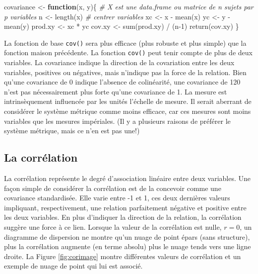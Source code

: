 \documentclass[
]{book}
\newenvironment{Shaded}{}{}
\newcommand{\CommentTok}[1]{\textit{#1}}
\newcommand{\ControlFlowTok}[1]{\textbf{#1}}
\newcommand{\DecValTok}[1]{#1}
\newcommand{\FunctionTok}[1]{#1}
\newcommand{\NormalTok}[1]{#1}
\newcommand{\OtherTok}[1]{#1}
\newcommand{\SpecialCharTok}[1]{#1}
\begin{document}
\begin{Shaded}
\begin{Highlighting}[]
\NormalTok{covariance }\OtherTok{\textless{}{-}} \ControlFlowTok{function}\NormalTok{(x, y)\{}
  \CommentTok{\# X est une data.frame ou matrice de n sujets par p variables}
\NormalTok{  n }\OtherTok{\textless{}{-}} \FunctionTok{length}\NormalTok{(x)}
  \CommentTok{\# centrer variables}
\NormalTok{  xc }\OtherTok{\textless{}{-}}\NormalTok{ x }\SpecialCharTok{{-}} \FunctionTok{mean}\NormalTok{(x)}
\NormalTok{  yc }\OtherTok{\textless{}{-}}\NormalTok{ y }\SpecialCharTok{{-}} \FunctionTok{mean}\NormalTok{(y)}
\NormalTok{  prod.xy }\OtherTok{\textless{}{-}}\NormalTok{ xc }\SpecialCharTok{*}\NormalTok{ yc}
\NormalTok{  cov.xy }\OtherTok{\textless{}{-}} \FunctionTok{sum}\NormalTok{(prod.xy) }\SpecialCharTok{/}\NormalTok{ (n}\DecValTok{{-}1}\NormalTok{)}
  \FunctionTok{return}\NormalTok{(cov.xy)}
\NormalTok{\}}
\end{Highlighting}
\end{Shaded}

La fonction de base \texttt{cov()} sera plus efficace (plus robuste et plus simple) que la fonction maison précédente. La fonction \texttt{cov()} peut tenir compte de plus de deux variables.
La covariance indique la direction de la covariation entre les deux variables, positives ou négatives, mais n'indique pas la force de la relation. Bien qu'une covariance de 0 indique l'absence de colinéarité, une covariance de 120 n'est pas nécessairement plus forte qu'une covariance de 1. La mesure est intrinsèquement influencée par les unités l'échelle de mesure. Il serait aberrant de considérer le système métrique comme moins efficace, car ces mesures sont moins variables que les mesures impériales. (Il y a plusieurs raisons de préférer le système métrique, mais ce n'en est pas une!)

\hypertarget{la-corruxe9lation}{%
\subsection{La corrélation}\label{la-corruxe9lation}}

La corrélation représente le degré d'association linéaire entre deux variables. Une façon simple de considérer la corrélation est de la concevoir comme une covariance standardisée. Elle varie entre -1 et 1, ces deux dernières valeurs impliquant, respectivement, une relation parfaitement négative et positive entre les deux variables. En plus d'indiquer la direction de la relation, la corrélation suggère une force à ce lien. Lorsque la valeur de la corrélation est nulle, \(r=0\), un diagramme de dispersion ne montre qu'un nuage de point épars (sans structure), plus la corrélation augmente (en terme absolu) plus le nuage tends vers une ligne droite. La Figure \ref{fig:corimage} montre différentes valeurs de corrélation et un exemple de nuage de point qui lui est associé.
\end{document}
